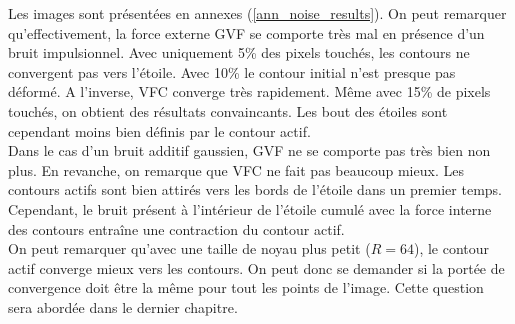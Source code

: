 Les images sont présentées en annexes (\ref{ann_noise_results}). On peut remarquer qu'effectivement, la force externe GVF se comporte très mal en présence d'un bruit impulsionnel. Avec uniquement 5\% des pixels touchés, les contours ne convergent pas vers l'étoile. Avec 10\% le contour initial n'est presque pas déformé. A l'inverse, VFC converge très rapidement. Même avec 15\% de pixels touchés, on obtient des résultats convaincants. Les bout des étoiles sont cependant moins bien définis par le contour actif.\\

Dans le cas d'un bruit additif gaussien, GVF ne se comporte pas très bien non plus. En revanche, on remarque que VFC ne fait pas beaucoup mieux. Les contours actifs sont bien attirés vers les bords de l'étoile dans un premier temps. Cependant, le bruit présent à l'intérieur de l'étoile cumulé avec la force interne des contours entraîne une contraction du contour actif.\\

On peut remarquer qu'avec une taille de noyau plus petit ($R = 64$), le contour actif converge mieux vers les contours. On peut donc se demander si la portée de convergence doit être la même pour tout les points de l'image. Cette question sera abordée dans le dernier chapitre.
